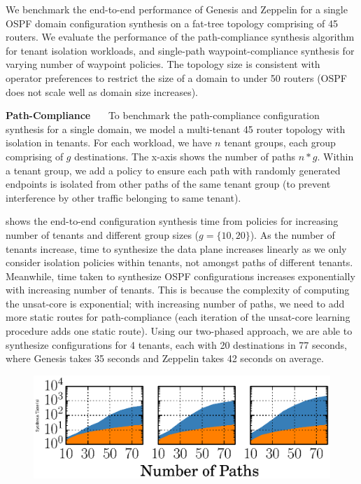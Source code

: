 We benchmark the end-to-end performance of Genesis and Zeppelin
for a single OSPF domain configuration  synthesis on a fat-tree 
topology comprising of 45 routers. We evaluate the performance
of the path-compliance synthesis algorithm for tenant 
isolation workloads, and single-path waypoint-compliance 
synthesis for varying number of waypoint policies.
The topology size is consistent with operator preferences to restrict
the size of a domain to under 50 routers (OSPF does not scale
well as domain size increases).

\noindent\textbf{Path-Compliance}~~~
To benchmark the path-compliance 
configuration synthesis for a single domain, we 
model a multi-tenant 45 router topology with 
isolation in tenants. For each 
workload, we have $n$ tenant groups, 
each group comprising of $g$ destinations. 
The x-axis shows the number of paths $n * g$. 
Within a tenant group, we add a policy to ensure
each path with randomly generated endpoints 
is isolated from other paths of the same tenant group 
(to prevent interference by other traffic belonging to
same tenant).  

shows the end-to-end configuration synthesis time from policies 
for increasing number of tenants and different group sizes ($g =
\{10,20\}$). As the number of tenants increase, time to 
synthesize the data plane increases linearly as we only 
consider isolation policies within tenants, not amongst paths 
of different tenants. Meanwhile, time taken to synthesize 
OSPF configurations increases exponentially with increasing 
number of tenants. This is because the complexity of computing 
the unsat-core is exponential; with increasing number of 
paths, we need to add more static routes for 
path-compliance (each iteration of the unsat-core learning
procedure adds one static route). Using our two-phased approach,
we are able to synthesize configurations for 4 tenants, each with
20 destinations in 77 seconds, where Genesis takes 35 seconds and
Zeppelin takes 42 seconds on average. 



\begin{figure}
	\begin{center}
		\includegraphics[width=0.6\columnwidth]{figures/ospfwaypoint.eps}
	\end{center}
\end{figure}

